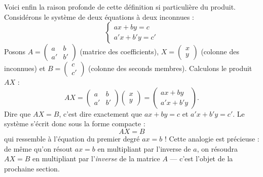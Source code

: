\documentclass[11pt]{article}
\begin{document}
Voici enfin la raison profonde de cette définition si particulière du produit. Considérons le système de deux équations à deux inconnues :
\[ \begin{cases} ax + by = c \\ a'x + b'y = c' \end{cases} \]
Posons $A = \begin{pmatrix} a & b \\ a' & b' \end{pmatrix}$ (matrice des coefficients), $X = \begin{pmatrix} x \\ y \end{pmatrix}$ (colonne des inconnues) et $B = \begin{pmatrix} c \\ c' \end{pmatrix}$ (colonne des seconds membres). Calculons le produit $AX$ :
\[ AX = \begin{pmatrix} a & b \\ a' & b' \end{pmatrix} \begin{pmatrix} x \\ y \end{pmatrix} = \begin{pmatrix} ax + by \\ a'x + b'y \end{pmatrix}. \]
Dire que $AX = B$, c'est dire exactement que $ax+by = c$ et $a'x+b'y = c'$. Le système s'écrit donc sous la forme compacte :
\[ \boxed{AX = B} \]
qui ressemble à l'équation du premier degré $ax = b$ ! Cette analogie est précieuse : de même qu'on résout $ax=b$ en multipliant par l'inverse de $a$, on résoudra $AX = B$ en multipliant par l'\emph{inverse} de la matrice $A$ — c'est l'objet de la prochaine section.
\end{document}
